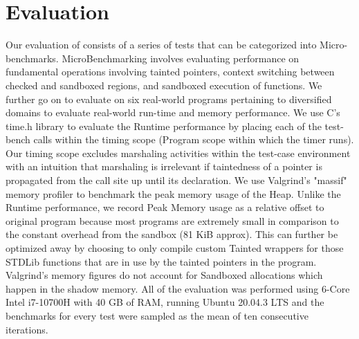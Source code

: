 \section{Evaluation}\label{sec:evaluation}

Our evaluation of \systemname consists of a series of tests that can be categorized into Micro-benchmarks.
MicroBenchmarking involves evaluating performance on fundamental operations involving tainted pointers, context switching between checked and sandboxed regions, and sandboxed execution of functions. We further go on to evaluate \systemname on six real-world programs pertaining to diversified domains to evaluate real-world run-time and memory performance. We use C's \<time.h\> library to evaluate the Runtime performance by placing each of the test-bench calls within the timing scope (Program scope within which the timer runs). Our timing scope excludes marshaling activities within the test-case environment with an intuition that marshaling is irrelevant if tainted\-ness of a pointer is propagated from the call site up until its declaration. We use Valgrind's "massif" memory profiler to benchmark the peak memory usage of the Heap. Unlike the Runtime performance, we record Peak Memory usage as a relative offset to original program because most programs are extremely small in comparison to the constant overhead from the sandbox (81 KiB approx). This can further be optimized away by choosing to only compile custom Tainted wrappers for those STDLib functions that are in use by the tainted pointers in the program. Valgrind's memory figures do not account for Sandboxed allocations which happen in the shadow memory. 
All of the evaluation was performed using 6-Core Intel i7-10700H with 40 GB of RAM, running Ubuntu 20.04.3 LTS and the benchmarks for every test were sampled as the mean of ten consecutive iterations.

